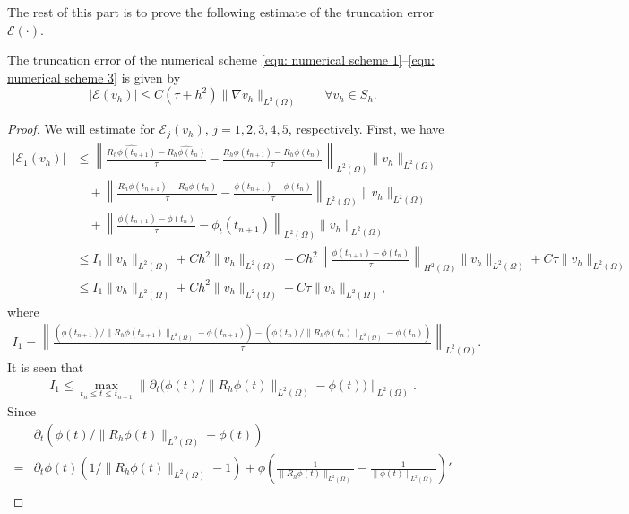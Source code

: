 \documentclass{siamart250211}
\def\nn{\nonumber}
\begin{document}
The rest of this part is to prove the following estimate of the truncation error $\mathcal{E}(\cdot)$.
\begin{lemma}\label{lem: truncation error}
	The truncation error of the numerical scheme \eqref{equ: numerical scheme 1}--\eqref{equ: numerical scheme 3} is given by
	\begin{equation}
		|\mathcal{E}(v_h)| \le C  (\tau + h^2) \|\nabla v_h\|_{L^2(\Omega)} \qquad \forall v_h \in S_h.
	\end{equation}
\end{lemma}
\begin{proof}
We will estimate for $\mathcal{E}_j(v_h)$, $j = 1,2,3,4,5$, respectively.
First, we have 
\begin{align}
	|\mathcal{E}_1(v_h)| & \le \left\| \frac{\widehat{R_h\phi(t_{n+1})} - \widehat{R_h\phi(t_{n})}}{\tau} - \frac{R_h\phi(t_{n+1}) - R_h\phi(t_n)}{\tau} \right\|_{L^2(\Omega)}\|v_h\|_{L^2(\Omega)} \nn  \\
	& \quad + \left\| \frac{R_h\phi(t_{n+1}) - R_h\phi(t_n)}{\tau} - \frac{\phi(t_{n+1}) - \phi(t_n)}{\tau}  \right\|_{L^2(\Omega)}\|v_h\|_{L^2(\Omega)} \nn \\
	& \quad + \left\| \frac{\phi(t_{n+1}) - \phi(t_n)}{\tau} - \phi_t(t_{n+1})  \right\|_{L^2(\Omega)}\|v_h\|_{L^2(\Omega)} \nn \\
	& \le I_1\|v_h\|_{L^2(\Omega)} + Ch^2\|v_h\|_{L^2(\Omega)}   + Ch^2  \left\|\frac{\phi(t_{n+1}) - \phi(t_n)}{\tau}  \right\|_{H^2(\Omega)}\|v_h\|_{L^2(\Omega)} + C \tau \|v_h\|_{L^2(\Omega)} \nn \\
	& \le I_1 \|v_h\|_{L^2(\Omega)} + Ch^2 \|v_h\|_{L^2(\Omega)} + C \tau \|v_h\|_{L^2(\Omega)},
\end{align}
where 
\begin{align*}
	 I_1 = \left\| \frac{(\phi(t_{n+1})/\|R_h\phi(t_{n+1})\|_{L^2(\Omega)} - \phi(t_{n+1})) - (\phi(t_n)/\|R_h\phi(t_n)\|_{L^2(\Omega)} - \phi(t_n))}{\tau}  \right\|_{L^2(\Omega)}.
\end{align*}
It is seen that
\begin{align*}
	I_1 \le \max_{t_n \le t \le t_{n+1}}\Big\| \partial_t\big(\phi(t)/\|R_h\phi(t)\|_{L^2(\Omega)} - \phi(t)\big) \Big\|_{L^2(\Omega)}.
\end{align*}
Since
\begin{align*}
	&\partial_t(\phi(t)/\|R_h\phi(t)\|_{L^2(\Omega)} - \phi(t)) \\
	  = &\partial_t \phi(t) (1/\|R_h\phi(t)\|_{L^2(\Omega)} - 1) + \phi \left( \frac{1}{\|R_h\phi(t)\|_{L^2(\Omega)}} - \frac{1}{\|\phi(t)\|_{L^2(\Omega)}}  \right)' \\

\end{align*}
\end{proof}
\end{document}
